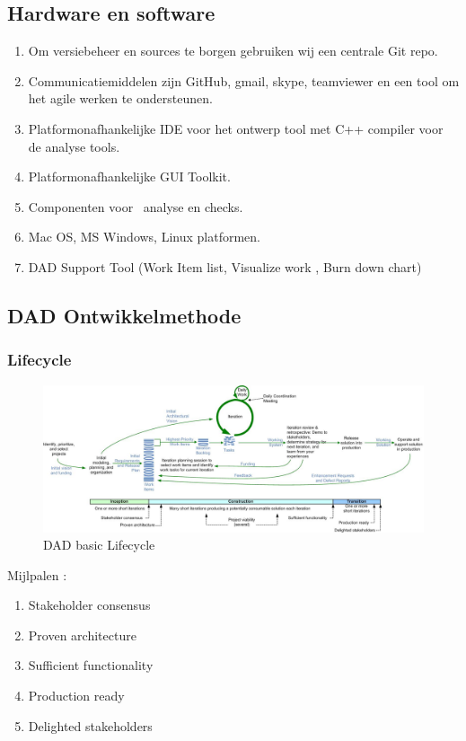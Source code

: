 \subsection{Hardware en software}
\begin{enumerate}
	\item Om versiebeheer en sources te borgen gebruiken wij een centrale Git repo.
	\item Communicatiemiddelen zijn GitHub, gmail, skype,  teamviewer en een tool om
		het agile werken te ondersteunen.
	\item Platformonafhankelijke IDE voor het ontwerp tool met C++ compiler voor de analyse tools.
	\item Platformonafhankelijke GUI Toolkit.
	\item Componenten voor \xmas\ analyse en checks.
	\item Mac OS,  MS Windows, Linux platformen.
	\item DAD Support Tool (Work Item list, Visualize work , Burn down chart)
\end{enumerate}

\subsection{DAD Ontwikkelmethode}
\subsubsection{Lifecycle}

\begin{figure}
  \includegraphics[width=\textwidth]{dadLifecycleUP2}
  \caption{DAD basic Lifecycle}
\end{figure}
Mijlpalen :
\begin{enumerate}
\item Stakeholder consensus
\item Proven architecture
\item Sufficient functionality
\item Production ready
\item Delighted stakeholders
\end{enumerate}

